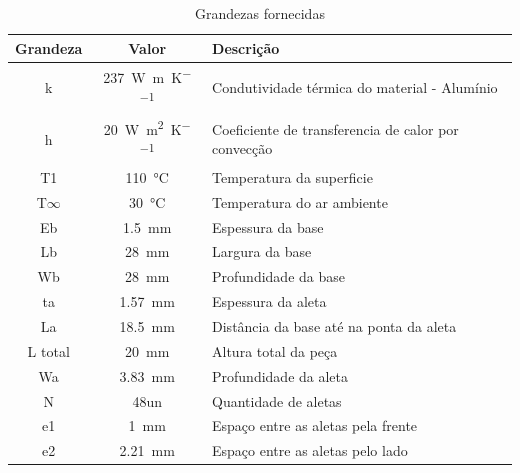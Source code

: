 \begin{table}[h]
    \ABNTEXfontereduzida
    \centering
    \caption{Grandezas fornecidas}
    \label{tab:grandezasFornecidas}
    \begin{tabular}{c c l}\toprule
        Grandeza    & Valor                                      & Descrição                                           \\
        \toprule
        k           & \SI{237}{\watt\per\meter\per\kelvin}       & Condutividade térmica do material - Alumínio        \\
        h           & \SI{20}{\watt\per\square\meter\per\kelvin} & Coeficiente de transferencia de calor por convecção \\
        T1          & \SI{110}\degreeCelsius                     & Temperatura da superficie                           \\
        T\(\infty\) & \SI{30}\degreeCelsius                      & Temperatura do ar ambiente                          \\
        Eb          & \SI{1,5}{\milli\meter}                     & Espessura da base                                   \\
        Lb          & \SI{28}{\milli\meter}                      & Largura da base                                     \\
        Wb          & \SI{28}{\milli\meter}                      & Profundidade da base                                \\
        ta          & \SI{1,57}{\milli\meter}                    & Espessura da aleta                                  \\
        La          & \SI{18,5}{\milli\meter}                    & Distância da base até na ponta da aleta             \\
        L total     & \SI{20}{\milli\meter}                      & Altura total da peça                                \\
        Wa          & \SI{3,83}{\milli\meter}                    & Profundidade da aleta                               \\
        N           & 48un                                       & Quantidade de aletas                                \\
        e1          & \SI{1}{\milli\meter}                       & Espaço entre as aletas pela frente                  \\
        e2          & \SI{2,21}{\milli\meter}                    & Espaço entre as aletas pelo lado                    \\
        \bottomrule
    \end{tabular}
    \fonteproprioautor
\end{table}